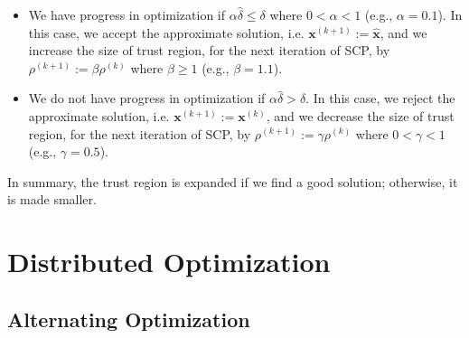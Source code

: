 \documentclass[lang=cn,10pt]{gorgeousnbook}
\numberwithin{equation}{section}%
\numberwithin{figure}{section}%
\begin{document}
\begin{itemize}\itemsep0em
\item We have progress in optimization if $\alpha \widehat{\delta} \leq \delta$ where $0 < \alpha < 1$ (e.g., $\alpha = 0.1$).
In this case, we accept the approximate solution, i.e. $\boldsymbol{x}^{(k+1)} := \widehat{\boldsymbol{x}}$, and we increase the size of trust region, for the next iteration of SCP, by $\rho^{(k+1)} := \beta \rho^{(k)}$ where $\beta \geq 1$ (e.g., $\beta = 1.1$). 
\item We do not have progress in optimization if $\alpha \widehat{\delta} > \delta$.
In this case, we reject the approximate solution, i.e. $\boldsymbol{x}^{(k+1)} := \boldsymbol{x}^{(k)}$, and we decrease the size of trust region, for the next iteration of SCP, by $\rho^{(k+1)} := \gamma \rho^{(k)}$ where $0 < \gamma < 1$ (e.g., $\gamma = 0.5$).
\end{itemize}
In summary, the trust region is expanded if we find a good solution; otherwise, it is made smaller. 

\section{Distributed Optimization}

\subsection{Alternating Optimization}
\end{document}
